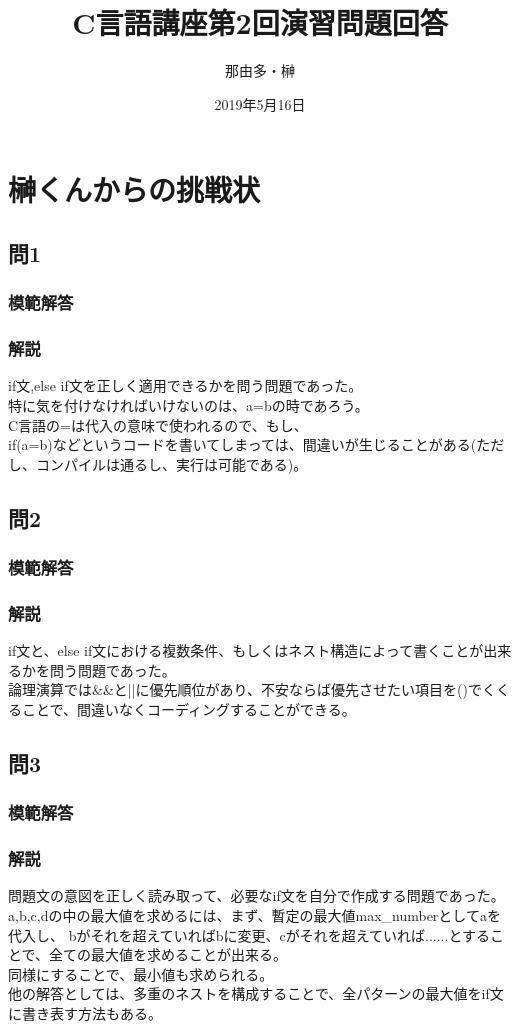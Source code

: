 \documentclass[a4j,titlepage,dvipdfmx]{jsarticle}   %
\title{C言語講座第2回演習問題回答}
\author{那由多・榊}
\date{2019年5月16日}
\newcommand{\codepath}{./code/02_Answer}
\begin{document}
\section{榊くんからの挑戦状}
\subsection{問1}
\subsubsection{模範解答}

\subsubsection{解説}
if文,else if文を正しく適用できるかを問う問題であった。\\
特に気を付けなければいけないのは、a=bの時であろう。\\
C言語の=は代入の意味で使われるので、もし、\\
if(a=b)などというコードを書いてしまっては、間違いが生じることがある(ただし、コンパイルは通るし、実行は可能である)。\\

\subsection{問2}
\subsubsection{模範解答}

\subsubsection{解説}
if文と、else if文における複数条件、もしくはネスト構造によって書くことが出来るかを問う問題であった。\\
論理演算では&&と||に優先順位があり、不安ならば優先させたい項目を()でくくることで、間違いなくコーディングすることができる。\\
\subsection{問3}
\subsubsection{模範解答}

\subsubsection{解説}
問題文の意図を正しく読み取って、必要なif文を自分で作成する問題であった。\\
a,b,c,dの中の最大値を求めるには、まず、暫定の最大値max_numberとしてaを代入し、
bがそれを超えていればbに変更、cがそれを超えていれば......とすることで、全ての最大値を求めることが出来る。\\
同様にすることで、最小値も求められる。\\
他の解答としては、多重のネストを構成することで、全パターンの最大値をif文に書き表す方法もある。\\
\end{document}
